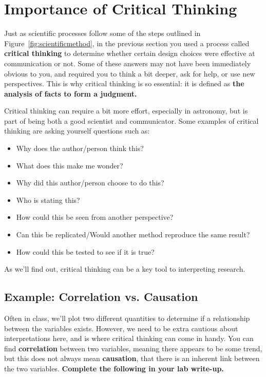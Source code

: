 \documentclass[11pt]{article}%
\begin{document}

\bigskip

\section{Importance of Critical Thinking}

Just as scientific processes follow some of the steps outlined in Figure~\ref{fig:scientificmethod}, in the previous section you used a process called \textbf{critical thinking} to determine whether certain design choices were effective at communication or not. Some of these answers may not have been immediately obvious to you, and required you to think a bit deeper, ask for help, or use new perspectives. This is why critical thinking is so essential: it is defined as \textbf{the analysis of facts to form a judgment.}

Critical thinking can require a bit more effort, especially in astronomy, but is part of being both a good scientist and communicator. Some examples of critical thinking are asking yourself questions such as:
\begin{itemize}
    \item Why does the author/person think this?
    \item What does this make me wonder?
    \item Why did this author/person choose to do this?
    \item Who is stating this?
    \item How could this be seen from another perspective?
    \item Can this be replicated/Would another method reproduce the same result?
    \item How could this be tested to see if it is true?
\end{itemize}

As we'll find out, critical thinking can be a key tool to interpreting research.

\subsection{Example: Correlation vs. Causation}

Often in class, we'll plot two different quantities to determine if a relationship between the variables exists. However, we need to be extra cautious about interpretations here, and is where critical thinking can come in handy. You can find \textbf{correlation} between two variables, meaning there appears to be some trend, but this does not always mean \textbf{causation}, that there is an inherent link between the two variables. \textbf{Complete the following in your lab write-up.}
\end{document}
